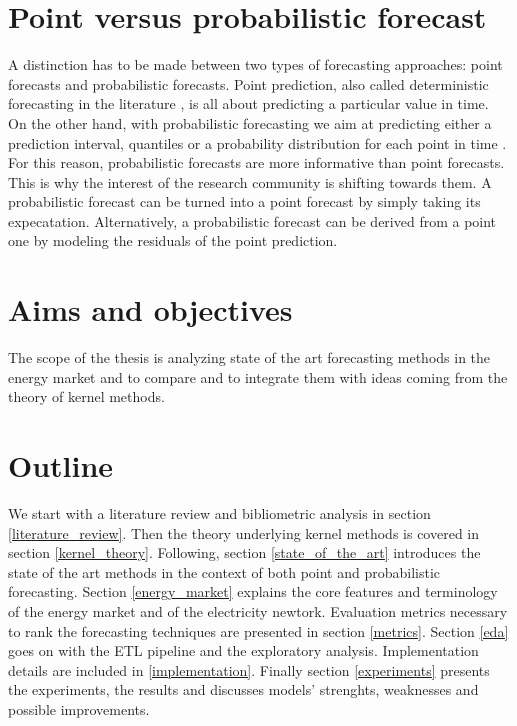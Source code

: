\section{Point versus probabilistic forecast}
A distinction has to be made between two types of forecasting approaches: point forecasts and probabilistic forecasts.
Point prediction, also called deterministic forecasting in the literature \cite{EPF_review}, is all about predicting a particular value in time.
On the other hand, with probabilistic forecasting we aim at predicting either a prediction interval, quantiles or a probability distribution for each point in time \cite{nowotarski}. For this reason, probabilistic forecasts are more informative than point forecasts. This is why the interest of the research community is shifting towards them.
A probabilistic forecast can be turned into a point forecast by simply taking its expecatation.
Alternatively, a probabilistic forecast can be derived from a point one by modeling the residuals of the point prediction.



\section{Aims and objectives}


The scope of the thesis is analyzing state of the art forecasting methods in the energy market and to compare and to integrate them with ideas coming from the theory of kernel methods.  



\section{Outline}
We start with a literature review and bibliometric analysis in section \ref{literature_review}.
Then the theory underlying kernel methods is covered in section \ref{kernel_theory}. Following, section \ref{state_of_the_art} introduces the state of the art methods in the context of both point and probabilistic forecasting. Section \ref{energy_market} explains the core features and terminology of the energy market and of the electricity newtork.
Evaluation metrics necessary to rank the forecasting techniques are presented in section \ref{metrics}. Section \ref{eda} goes on with the ETL pipeline and the exploratory analysis. 
Implementation details are included in \ref{implementation}.
Finally section \ref{experiments} presents the experiments, the results and discusses models' strenghts, weaknesses and possible improvements.